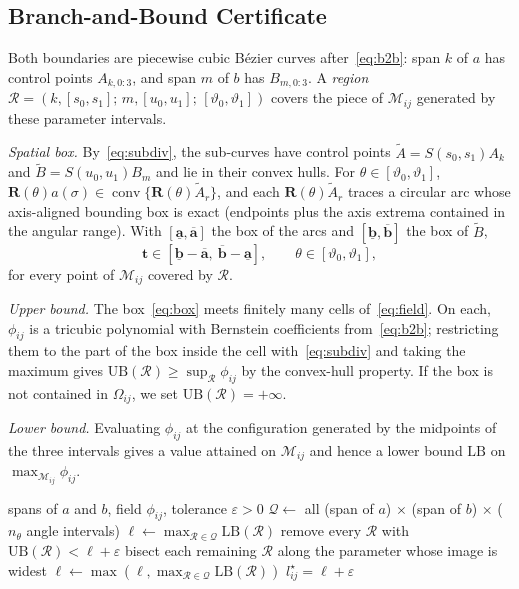 \documentclass[journal]{IEEEtran}
\theoremstyle{definition}
\newcommand{\Mset}{\mathcal{M}}
\newcommand{\Rot}{\mathbf{R}}
\DeclareMathOperator{\conv}{conv}
\begin{document}
\subsection{Branch-and-Bound Certificate}
Both boundaries are piecewise cubic B\'ezier curves after~\eqref{eq:b2b}: span $k$ of $a$ has
control points $A_{k,0:3}$, and span $m$ of $b$ has $B_{m,0:3}$. A \emph{region}
$\mathcal R=(k,[s_0,s_1];\,m,[u_0,u_1];\,[\vartheta_0,\vartheta_1])$ covers the piece of
$\Mset_{ij}$ generated by these parameter intervals.

\emph{Spatial box.} By~\eqref{eq:subdiv}, the sub-curves have control points
$\tilde A=S(s_0,s_1)A_k$ and $\tilde B=S(u_0,u_1)B_m$ and lie in their convex hulls. For
$\theta\in[\vartheta_0,\vartheta_1]$, $\Rot(\theta)a(\sigma)\in\conv\{\Rot(\theta)\tilde A_r\}$, and
each $\Rot(\theta)\tilde A_r$ traces a circular arc whose axis-aligned bounding box is exact
(endpoints plus the axis extrema contained in the angular range). With
$[\underline{\mathbf a},\overline{\mathbf a}]$ the box of the arcs and
$[\underline{\mathbf b},\overline{\mathbf b}]$ the box of $\tilde B$,
\begin{equation}\label{eq:box}
\mathbf t\in[\underline{\mathbf b}-\overline{\mathbf a},\ \overline{\mathbf b}-\underline{\mathbf a}],
\qquad \theta\in[\vartheta_0,\vartheta_1],
\end{equation}
for every point of $\Mset_{ij}$ covered by $\mathcal R$.

\emph{Upper bound.} The box~\eqref{eq:box} meets finitely many cells of~\eqref{eq:field}. On each,
$\phi_{ij}$ is a tricubic polynomial with Bernstein coefficients from~\eqref{eq:b2b}; restricting
them to the part of the box inside the cell with~\eqref{eq:subdiv} and taking the maximum gives
$\mathrm{UB}(\mathcal R)\ge\sup_{\mathcal R}\phi_{ij}$ by the convex-hull property. If the box is not
contained in $\Omega_{ij}$, we set $\mathrm{UB}(\mathcal R)=+\infty$.

\emph{Lower bound.} Evaluating $\phi_{ij}$ at the configuration generated by the midpoints of the
three intervals gives a value attained on $\Mset_{ij}$ and hence a lower bound $\mathrm{LB}$ on
$\max_{\Mset_{ij}}\phi_{ij}$.

\begin{algorithm}[t]
\caption{Contact certificate for a pair $(i,j)$}\label{alg:bb}
\begin{algorithmic}[1]
\Require spans of $a$ and $b$, field $\phi_{ij}$, tolerance $\varepsilon>0$
\State $\mathcal Q\gets$ all (span of $a$) $\times$ (span of $b$) $\times$ ($n_\theta$ angle intervals)
\State $\ell\gets\max_{\mathcal R\in\mathcal Q}\mathrm{LB}(\mathcal R)$
  \State remove every $\mathcal R$ with $\mathrm{UB}(\mathcal R)<\ell+\varepsilon$
  \State bisect each remaining $\mathcal R$ along the parameter whose image is widest
    \State $\ell\gets\max(\ell,\max_{\mathcal R\in\mathcal Q}\mathrm{LB}(\mathcal R))$
  \EndIf
\EndWhile
\State \Return $l^\star_{ij}=\ell+\varepsilon$
\end{algorithmic}
\end{algorithm}
\end{document}

